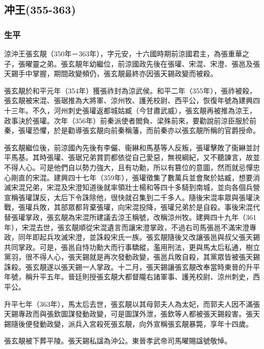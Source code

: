 
\subsection{冲王\tiny(355-363)}

\subsubsection{生平}

涼沖王張玄靚（350年－363年），字元安，十六國時期前涼國君主，為張重華之子，張曜靈之弟。張玄靚年幼繼位，前涼國政先後在張瓘、宋混、宋澄、張邕及張天錫手中掌握，期間政變頻仍，張玄靚最終亦因張天錫政變而被殺。

張玄靚於和平元年（354年）獲張祚封為涼武侯。和平二年（355年），張祚被殺，張玄靚被宋混、張琚推為大將軍、涼州牧、護羌校尉、西平公，恢復年號為建興四十三年。不久，河州刺史張瓘返都城姑臧（今甘肅武威），張玄靚再被推為涼王，政事決於張瓘。次年（356年）前秦派使者閻負、梁殊前來，要勸說前涼臣服於前秦，張瓘恐懼，於是勸導張玄靚向前秦稱藩，而前秦亦以張玄靚所稱的官爵授命。

張玄靚繼位後，前涼國內先後有李儼、衞綝和馬基等人反叛，張瓘擊敗了衞綝並討平馬基。其時張瓘、張琚兄弟賞罰都依從自己愛惡，無視綱紀，又不聽諫言，故並不得人心。可是他們自以勢力強大，且有功勳，所以有篡位的意圖，然而就忌憚忠心剛直的宋混。建興四十七年（359年），張瓘徵集了數萬兵並會聚於姑臧，想要消滅宋混兄弟，宋混及宋澄知道後就率領壯士楊和等四十多騎到南城，並向各個兵營宣稱張瓘謀反，太后下令誅除他，很快就召集到二千多人。隨後宋混率眾與張瓘決戰，張瓘兵敗，其部眾都背棄張瓘，向宋混投降，張瓘兄弟於是自殺。事後宋混代替張瓘掌政，張玄靚為宋混所建議去涼王稱號，改稱涼州牧。建興四十九年（361年），宋混去世，張玄靚順從宋混遺言而讓宋澄掌政，不過右司馬張邕不滿宋澄專政，同年即起兵攻滅宋澄，並誅殺宋氏一族。張玄靚隨後又改讓張邕與叔父張天錫共同掌政。可是，張邕自恃功勳大而行事驕縱，濫用刑法，更與馬太后私通，樹立黨羽，很不得人心，張天錫就是再次發動政變，張邕兵敗自殺，其黨眾皆被張天錫誅殺。張玄靚遂以張天錫一人掌政。十二月，張天錫讓張玄靚改奉當時東晉的升平年號，稱升平五年。晉廷則授張玄靚大都督隴右諸軍事、護羌校尉、涼州刺史，西平公。

升平七年（363年），馬太后去世，張玄靚以其母郭夫人為太妃，而郭夫人因不滿張天錫專政而與張欽圖謀發動政變，可是圖謀外泄，張欽等人都被張天錫殺害。張天錫隨後便發動政變，派兵入宮殺死張玄靚，向外宣稱張玄靚暴斃，享年十四歲。

張玄靚被下葬平陵。張天錫私諡為沖公。東晉孝武帝司馬曜賜諡號敬悼。

